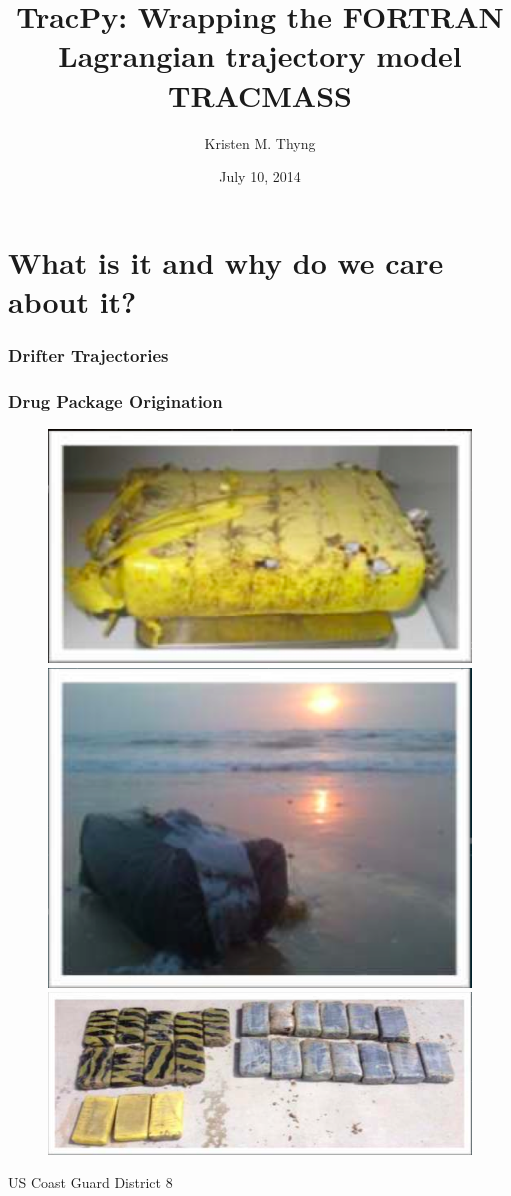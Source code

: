 \documentclass[ignorenonframetext]{beamer}
\title[SciPy 2014]{TracPy: Wrapping the FORTRAN \\Lagrangian trajectory model TRACMASS}
\author{Kristen M. Thyng}
\date{July 10, 2014}
\institute[Texas A\&M]{ 
	Robert D. Hetland\\
	Texas A\&M University}
\begin{document}
\begin{frame}
	\titlepage
\end{frame}





\section{What is it and why do we care about it?}

\begin{frame}[t]\frametitle{Drifter Trajectories}
	\begin{figure}
	  	\centering
	\end{figure}
\end{frame}

\begin{frame}[t]\frametitle{Drug Package Origination}
	\begin{figure}[htbp]
		\centering
		\includegraphics[width=.35\textwidth]{figures/drug1}
		\includegraphics[width=.35\textwidth]{figures/drug2}\\
		\includegraphics[width=.7\textwidth]{figures/drug3}
	\end{figure}
	\tiny{US Coast Guard District 8}
\end{frame}
\end{document}
